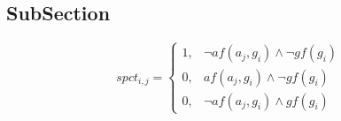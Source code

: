 \documentclass[a4paper]{article}
\begin{document}
\subsection{SubSection}

\begin{equation}
spct_{i,j} =
\begin{cases}
1, & \text{$\neg af(a_j,g_i) \wedge \neg gf(g_i)$}\\
0, & \text{$af(a_j,g_i) \wedge \neg gf(g_i)$}\\
0, & \text{$\neg af(a_j,g_i) \wedge gf(g_i)$}
\end{cases}
\end{equation}
\end{document}
